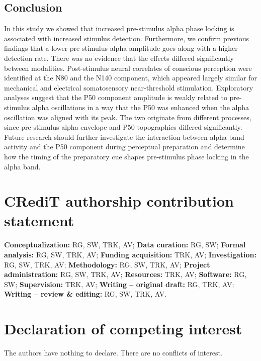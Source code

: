 \documentclass[11pt,a4paper,onecolumn]{article}
\begin{document}
\vspace{7pt}
\subsection*{Conclusion} 

In this study we showed that increased pre-stimulus alpha phase locking is associated with increased stimulus detection. Furthermore, we confirm previous findings that a lower pre-stimulus alpha amplitude goes along with a higher detection rate. There was no evidence that the effects differed significantly between modalities. Post-stimulus neural correlates of conscious perception were identified at the N80 and the N140 component, which appeared largely similar for mechanical and electrical somatosensory near-threshold stimulation. Exploratory analyses suggest that the P50 component amplitude is weakly related to pre-stimulus alpha oscillations in a way that the P50 was enhanced when the alpha oscillation was aligned with its peak. The two originate from different processes, since pre-stimulus alpha envelope and P50 topographies differed significantly.
Future research should further investigate the interaction between alpha-band activity and the P50 component during perceptual preparation and determine how the timing of the preparatory cue shapes pre-stimulus phase locking in the alpha band.

\vspace{7pt}
\section*{CRediT authorship contribution statement}

\noindent
\textbf{Conceptualization:} RG, SW, TRK, AV;
\textbf{Data curation:} RG, SW;
\textbf{Formal analysis:} RG, SW, TRK, AV;
\textbf{Funding acquisition:} TRK, AV;
\textbf{Investigation:} RG, SW, TRK, AV;
\textbf{Methodology:} RG, SW, TRK, AV;
\textbf{Project administration:} RG, SW, TRK, AV;
\textbf{Resources:} TRK, AV;
\textbf{Software:} RG, SW;
\textbf{Supervision:} TRK, AV;
\textbf{Writing -- original draft:} RG, TRK, AV;
\textbf{Writing -- review \& editing:} RG, SW, TRK, AV.

\vspace{7pt}
\section*{Declaration of competing interest}

\noindent
The authors have nothing to declare. There are no conflicts of interest.
\end{document}
